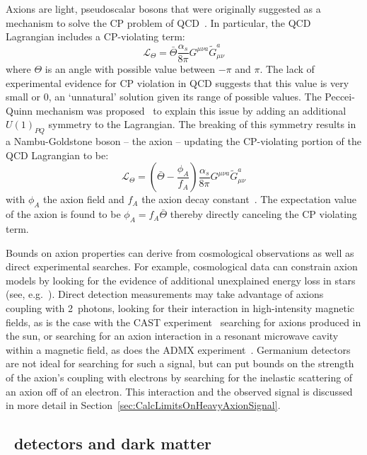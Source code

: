 	Axions are light, pseudoscalar bosons that were originally suggested as a mechanism to solve the CP problem of QCD~\cite{Pec77}.  In particular, the QCD Lagrangian includes a CP-violating term:
			\[
			\mathcal{L}_{\Theta} = \bar{\Theta} \frac{\alpha_s}{8 \pi} G^{\mu \nu a} \tilde{G}_{\mu \nu}^{a}
			\]
where $\Theta$ is an angle with possible value between $-\pi$ and $\pi$.  The lack of experimental evidence for CP violation in QCD suggests that this value is very small or 0, an `unnatural' solution given its range of possible values.  The Peccei-Quinn mechanism was proposed~\cite{Pec77} to explain this issue by adding an additional $U(1)_{PQ}$ symmetry to the Lagrangian.  The breaking of this symmetry results in a Nambu-Goldstone boson -- the axion -- updating the CP-violating portion of the QCD Lagrangian to be:
			\[
			\mathcal{L}_{\Theta} = \left( \bar{\Theta} - \frac{\phi_{A}}{f_{A}}\right) \frac{\alpha_s}{8 \pi} G^{\mu \nu a} \tilde{G}_{\mu \nu}^{a}
			\]	
with $\phi_{A}$ the axion field and $f_{A}$ the axion decay constant~\cite{Amsler20081}.  The expectation value of the axion is found to be $\phi_{A} = f_{A} \bar{\Theta}$ thereby directly canceling the CP violating term.  
	
	Bounds on axion properties can derive from cosmological observations as well as direct experimental searches.  For example, cosmological data can constrain axion models by looking for the evidence of additional unexplained energy loss in stars (see, e.g.~\cite{Gondolo09,Raf96}).  Direct detection measurements may take advantage of axions coupling with 2~photons, looking for their interaction in high-intensity magnetic fields, as is the case with the CAST experiment~\cite{Arik09} searching for axions produced in the sun, or searching for an axion interaction in a resonant microwave cavity within a magnetic field, as does the ADMX experiment~\cite{Asz10}.  Germanium detectors are not ideal for searching for such a signal, but can put bounds on the strength of the axion's coupling with electrons by searching for the inelastic scattering of an axion off of an electron.  This interaction and the observed signal is discussed in more detail in Section~\ref{sec:CalcLimitsOnHeavyAxionSignal}.
		
		\subsection{\ppc~detectors and dark matter}

	
	
